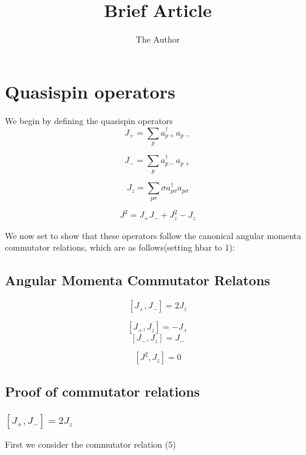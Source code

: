 \documentclass[11pt]{article} %
\title{Brief Article}
\author{The Author}
\begin{document}
\maketitle

\section{Quasispin operators}

We begin by defining the quasispin operators\\

\begin{equation}
J_+=\sum_p a_{p+}^\dagger a_{p-}
\end{equation}

\begin{equation}
J_-=\sum_p a_{p-}^\dagger a_{p+}
\end{equation}

\begin{equation}
J_z=\sum_{p\sigma}\sigma a_{p\sigma}^\dagger a_{p\sigma}
\end{equation}
	
\begin{equation}
J^2=J_+J_-+J_z^2-J_z
\end{equation}


We now set to show that these operators follow the canonical angular momenta commutator relations, which are as follows(setting hbar to 1):\\
\subsection{Angular Momenta Commutator Relatons}
\begin{equation}
\left[  J_+, J_-  \right]=2J_z 
\end{equation}

\begin{equation}
\left[J_+,J_z\right]=-J_+
\end{equation}
\begin{equation}
\left[J_-,J_z\right]=J_-
\end{equation}

\begin{equation}
\left[J^2, J_z\right]=0\end{equation}
\subsection{Proof of commutator relations}
\subsubsection{$\left[  J_+, J_-  \right]=2J_z $}
First we consider the commutator relation (5)
\end{document}
